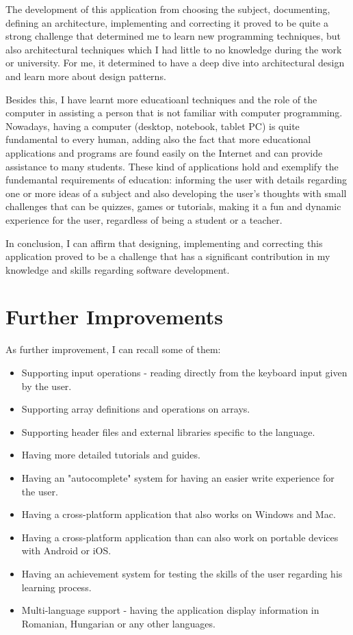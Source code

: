 \documentclass[12pt,a4paper,twoside]{report}
\begin{document}
The development of this application from choosing the subject, documenting, defining an architecture, implementing and correcting it proved to be quite a strong challenge that determined me to learn new programming techniques, but also architectural techniques which I had little to no knowledge during the work or university. For me, it determined to have a deep dive into architectural design and learn more about design patterns.

Besides this, I have learnt more educatioanl techniques and the role of the computer in assisting a person that is not familiar with computer programming. Nowadays, having a computer (desktop, notebook, tablet PC) is quite fundamental to every human, adding also the fact that more educational applications and programs are found easily on the Internet and can provide assistance to many students. These kind of applications hold and exemplify the fundemantal requirements of education: informing the user with details regarding one or more ideas of a subject and also developing the user's thoughts with small challenges that can be quizzes, games or tutorials, making it a fun and dynamic experience for the user, regardless of being a student or a teacher.

In conclusion, I can affirm that designing, implementing and correcting this application proved to be a challenge that has a significant contribution in my knowledge and skills regarding software development.
\section{Further Improvements}
As further improvement, I can recall some of them:
\begin{itemize}
	\item Supporting input operations - reading directly from the keyboard input given by the user.
	\item Supporting array definitions and operations on arrays.
	\item Supporting header files and external libraries specific to the language.
	\item Having more detailed tutorials and guides.
	\item Having an "autocomplete" system for having an easier write experience for the user.
	\item Having a cross-platform application that also works on Windows and Mac. 
	\item Having a cross-platform application than can also work on portable devices with Android or iOS.
	\item Having an achievement system for testing the skills of the user regarding his learning process. 
	\item Multi-language support - having the application display information in Romanian, Hungarian or any other languages. 
\end{itemize}


 
\end{document}
